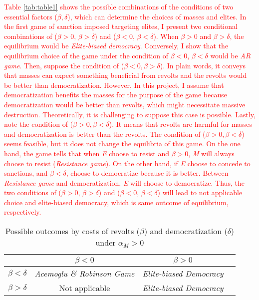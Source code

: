\documentclass[11pt]{article}
\begin{document}
\textcolor{red}{Table \ref{tab:table1} shows the possible combinations of the conditions of two essential factors ($\beta, \delta$), which can determine the choices of masses and elites. In the first game of sanction imposed targeting elites, I present two conditional combinations of ($\beta > 0$, $\beta > \delta$) and ($\beta < 0$, $\beta < \delta$). When $\beta > 0$ and $\beta > \delta$, the equilibrium would be \textit{Elite-biased democracy}. Conversely, I show that the equilibrium choice of the game under the condition of $\beta < 0$, $\beta < \delta$ would be \textit{AR game}. Then, suppose the condition of ($\beta < 0, \beta > \delta$). In plain words, it conveys that masses can expect something beneficial from revolts and the revolts would be better than democratization. However, In this project, I assume that democratization benefits the masses for the purpose of the game because democratization would be better than revolts, which might necessitate massive destruction. Theoretically, it is challenging to suppose this case is possible. Lastly, note the condition of ($\beta > 0, \beta < \delta$). It means that revolts are harmful for masses and democratization is better than the revolts. The condition of ($\beta > 0, \beta < \delta$) seems feasible, but it does not change the equilibria of this game. On the one hand, the game tells that when \textit{E} choose to resist and $\beta>0$,  \textit{M} will always choose to resist (\textit{Resistance game}). On the other hand, if \textit{E} choose to concede to sanctions, and $\beta < \delta$,  choose to democratize because it is better. Between \textit{Resistance game} and democratization, \textit{E} will choose to democratize. Thus, the two conditions of ($\beta > 0$, $\beta > \delta$) and ($\beta < 0$, $\beta < \delta$) will lead to not applicable choice and elite-biased democracy, which is same outcome of equilibrium, respectively.}

\begin{table}[!ht]
	\centering
	\begin{tabular}{l*{3}{c}}
		\toprule
		&\multicolumn{1}{c}{$\beta < 0$}		&\multicolumn{1}{c}{$\beta > 0$} \\
		\midrule
		$\beta < \delta$	   & \textit{Acemoglu \& Robinson Game} & \textit{Elite-biased Democracy}\\
		$\beta > \delta$	   & Not applicable					 	& \textit{Elite-biased Democracy}\\
		\bottomrule
	\end{tabular}
	\caption{Possible outcomes by costs of revolts ($\beta$) and democratization ($\delta$) under $\alpha_{M} > 0$}
	\label{tab:table2}
\end{table}
\end{document}
